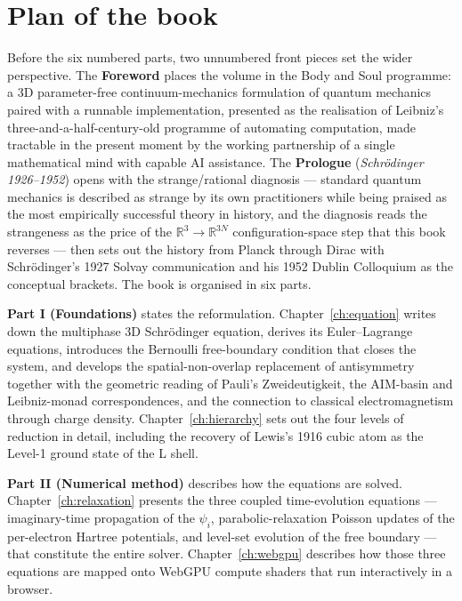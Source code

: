 \section{Plan of the book}

Before the six numbered parts, two unnumbered front pieces set the wider perspective. The \textbf{Foreword} places the volume in the Body and Soul programme: a 3D parameter-free continuum-mechanics formulation of quantum mechanics paired with a runnable implementation, presented as the realisation of Leibniz's three-and-a-half-century-old programme of automating computation, made tractable in the present moment by the working partnership of a single mathematical mind with capable AI assistance. The \textbf{Prologue} (\emph{Schr\"odinger 1926--1952}) opens with the strange/rational diagnosis --- standard quantum mechanics is described as strange by its own practitioners while being praised as the most empirically successful theory in history, and the diagnosis reads the strangeness as the price of the $\mathbb{R}^3 \to \mathbb{R}^{3N}$ configuration-space step that this book reverses --- then sets out the history from Planck through Dirac with Schr\"odinger's 1927 Solvay communication and his 1952 Dublin Colloquium as the conceptual brackets. The book is organised in six parts.

\textbf{Part I (Foundations)} states the reformulation. Chapter~\ref{ch:equation} writes down the multiphase 3D Schr\"odinger equation, derives its Euler--Lagrange equations, introduces the Bernoulli free-boundary condition that closes the system, and develops the spatial-non-overlap replacement of antisymmetry together with the geometric reading of Pauli's Zweideutigkeit, the AIM-basin and Leibniz-monad correspondences, and the connection to classical electromagnetism through charge density. Chapter~\ref{ch:hierarchy} sets out the four levels of reduction in detail, including the recovery of Lewis's 1916 cubic atom as the Level-1 ground state of the L shell.

\textbf{Part II (Numerical method)} describes how the equations are solved. Chapter~\ref{ch:relaxation} presents the three coupled time-evolution equations --- imaginary-time propagation of the $\psi_i$, parabolic-relaxation Poisson updates of the per-electron Hartree potentials, and level-set evolution of the free boundary --- that constitute the entire solver. Chapter~\ref{ch:webgpu} describes how those three equations are mapped onto WebGPU compute shaders that run interactively in a browser.

